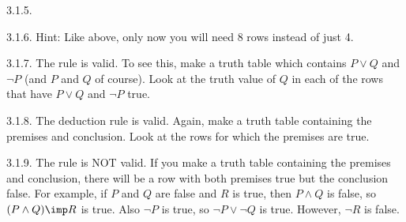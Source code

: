 \begin {itemize}
\begin{ans}{3.1.5.}
\end{ans}
\begin{ans}{3.1.6.}
    Hint: Like above, only now you will need 8 rows instead of just 4.
  
\end{ans}
\begin{ans}{3.1.7.}
    The rule is valid.  To see this, make a truth table which contains $P \vee Q$ and $\neg P$ (and $P$ and $Q$ of course).  Look at the truth value of $Q$ in each of the rows that have $P \vee Q$ and $\neg P$ true.
  
\end{ans}
\begin{ans}{3.1.8.}
    The deduction rule is valid.  Again, make a truth table containing the premises and conclusion.  Look at the rows for which the premises are true.
  
\end{ans}
\begin{ans}{3.1.9.}
    The rule is NOT valid.  If you make a truth table containing the premises and conclusion, there will be a row with both premises true but the conclusion false.  For example, if $P$ and $Q$ are false and $R$ is true, then $P \wedge Q$ is false, so $(P \wedge Q) \imp R$ is true.  Also $\neg P$ is true, so $\neg P \vee \neg Q$ is true.  However, $\neg R$ is false.
  
\end{ans}
\protect \end {itemize}
